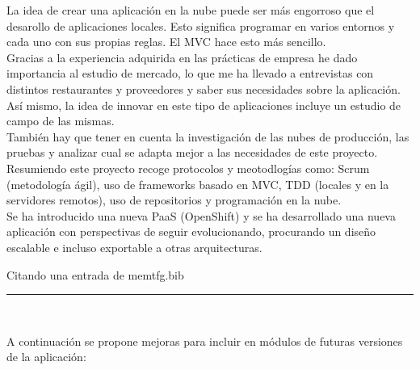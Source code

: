 
La idea de crear una aplicación en la nube puede ser más engorroso que el desarollo de aplicaciones locales. Esto significa programar en varios entornos y cada uno con sus propias reglas. El MVC hace esto más sencillo. \\

Gracias a la experiencia adquirida en las prácticas de empresa he dado importancia al estudio de mercado, lo que me ha llevado a entrevistas con distintos restaurantes y proveedores y saber sus necesidades sobre la aplicación. Así mismo, la idea de innovar en este tipo de aplicaciones incluye un estudio de campo de las mismas. \\

También hay que tener en cuenta la investigación de las nubes de producción, las pruebas y analizar cual se adapta mejor a las necesidades de este proyecto. \\

Resumiendo este proyecto recoge protocolos y meotodlogías como: Scrum (metodología ágil), uso de frameworks basado en MVC, TDD (locales y en la servidores remotos), uso de repositorios y programación en la nube. \\

Se ha introducido una nueva PaaS (OpenShift) y se ha desarrollado una nueva aplicación con perspectivas de seguir evolucionando, procurando un diseño escalable e incluso exportable a otras arquitecturas.

Citando una entrada de memtfg.bib \cite{URL:GitHub}


\begin{center}
	\rule{100mm}{0.2mm}\\
\end{center}

A continuación se propone mejoras para incluir en módulos de futuras versiones de la aplicación:

